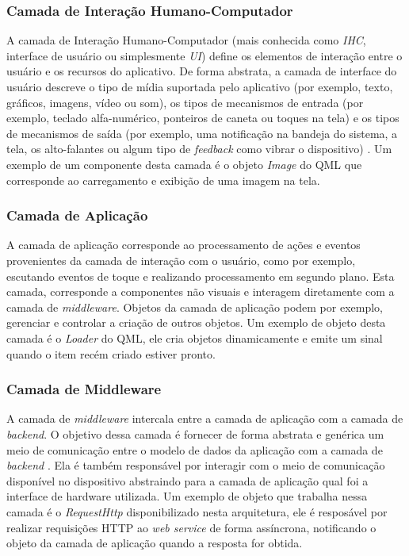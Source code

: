 \subsubsection{Camada de Interação Humano-Computador}
A camada de Interação Humano-Computador (mais conhecida como \textit{IHC}, interface de usuário ou simplesmente \textit{UI}) define os elementos de interação entre o usuário e os recursos do aplicativo. De forma abstrata, a camada de interface do usuário descreve o tipo de mídia suportada pelo aplicativo (por exemplo, texto, gráficos, imagens, vídeo ou som), os tipos de mecanismos de entrada (por exemplo, teclado alfa-numérico, ponteiros de caneta ou toques na tela) e os tipos de mecanismos de saída (por exemplo, uma notificação na bandeja do sistema, a tela, os alto-falantes ou algum tipo de \textit{feedback} como vibrar o dispositivo) \cite{Pabllo:2008:MMA:1621087.1621128}. Um exemplo de um componente desta camada é o objeto \textit{Image} do QML que corresponde ao carregamento e exibição de uma imagem na tela.

\subsubsection{Camada de Aplicação}
A camada de aplicação corresponde ao processamento de ações e eventos provenientes da camada de interação com o usuário, como por exemplo, escutando eventos de toque e realizando processamento em segundo plano. Esta camada, corresponde a componentes não visuais e interagem diretamente com a camada de \textit{middleware}. Objetos da camada de aplicação podem por exemplo, gerenciar e controlar a criação de outros objetos. Um exemplo de objeto desta camada é o \textit{Loader} do QML, ele cria objetos dinamicamente e emite um sinal quando o item recém criado estiver pronto.

\subsubsection{Camada de Middleware}
A camada de \textit{middleware} intercala entre a camada de aplicação com a camada de \textit{backend}. O objetivo dessa camada é fornecer de forma abstrata e genérica um meio de comunicação entre o modelo de dados da aplicação com a camada de \textit{backend} \cite{Pabllo:2008:MMA:1621087.1621128}. Ela é também responsável por interagir com o meio de comunicação disponível no dispositivo abstraindo para a camada de aplicação qual foi a interface de hardware utilizada. Um exemplo de objeto que trabalha nessa camada é o \textit{RequestHttp} disponibilizado nesta arquitetura, ele é resposável por realizar requisições HTTP ao \textit{web service} de forma assíncrona, notificando o objeto da camada de aplicação quando a resposta for obtida.

